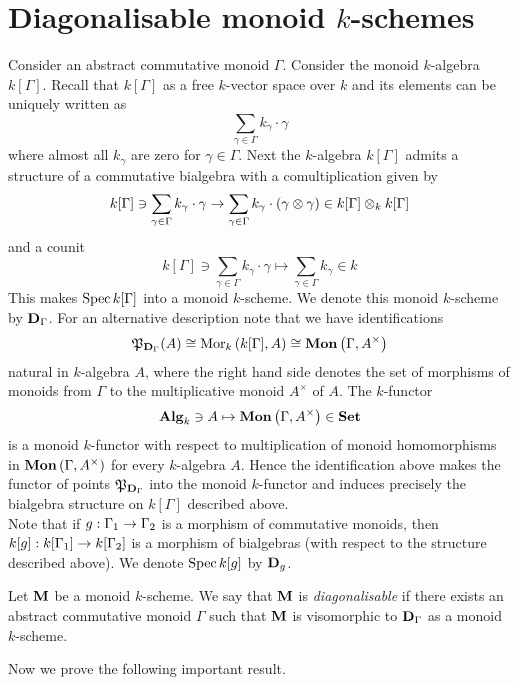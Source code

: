 \section{Diagonalisable monoid $k$-schemes}
\noindent
Consider an abstract commutative monoid $\Gamma$. Consider the monoid $k$-algebra $k[\Gamma]$. Recall that $k[\Gamma]$ as a free $k$-vector space over $k$ and its elements can be uniquely written as
$$\sum_{\gamma\in \Gamma}k_{\gamma}\cdot \gamma$$
where almost all $k_{\gamma}$ are zero for $\gamma \in \Gamma$. Next the $k$-algebra $k[\Gamma]$ admits a structure of a commutative bialgebra with a comultiplication given by
$$k[\Gamma] \ni \sum_{\gamma\in \Gamma} k_{\gamma}\cdot \gamma \rightarrow \sum_{\gamma\in \Gamma}k_{\gamma}\cdot \left(\gamma\otimes \gamma\right)\in  k[\Gamma]\otimes_kk[\Gamma]$$
and a counit
$$k[\Gamma]\ni \sum_{\gamma \in \Gamma}k_{\gamma}\cdot \gamma \mapsto \sum_{\gamma\in \Gamma}k_{\gamma}\in k$$
This makes $\mathrm{Spec}\, k[\Gamma]$ into a monoid $k$-scheme. We denote this monoid $k$-scheme by $\mathbf{D}_{\Gamma}$. For an alternative description note that we have identifications
$${\mathfrak P}_{\mathbf{D}_{\Gamma}}(A) \cong \mathrm{Mor}_k\left(k[\Gamma],A\right) \cong \mathbf{Mon}\left(\Gamma,A^{\times}\right)$$
natural in $k$-algebra $A$, where the right hand side denotes the set of morphisms of monoids from $\Gamma$ to the multiplicative monoid $A^{\times}$ of $A$. The $k$-functor
$$\mathbf{Alg}_k\ni A\mapsto \mathbf{Mon}\left(\Gamma,A^{\times}\right)\in \mathbf{Set}$$
is a monoid $k$-functor with respect to multiplication of monoid homomorphisms in $\mathbf{Mon}\left(\Gamma,A^{\times}\right)$ for every $k$-algebra $A$. Hence the identification above makes the functor of points ${\mathfrak P}_{\mathbf{D}_{\Gamma}}$ into the monoid $k$-functor and induces precisely the bialgebra structure on $k[\Gamma]$ described above.\\
Note that if $g:\Gamma_1\rightarrow \Gamma_2$ is a morphism of commutative monoids, then $k[g]:k[\Gamma_1]\rightarrow k[\Gamma_2]$ is a morphism of bialgebras (with respect to the structure described above). We denote $\mathrm{Spec}\, k[g]$ by $\mathbf{D}_{g}$.

\begin{definition}
Let $\mathbf{M}$ be a monoid $k$-scheme. We say that $\mathbf{M}$ is \textit{diagonalisable} if there exists an abstract commutative monoid $\Gamma$ such that $\mathbf{M}$ is visomorphic to $\mathbf{D}_{\Gamma}$ as a monoid $k$-scheme.
\end{definition}
\noindent
Now we prove the following important result.

